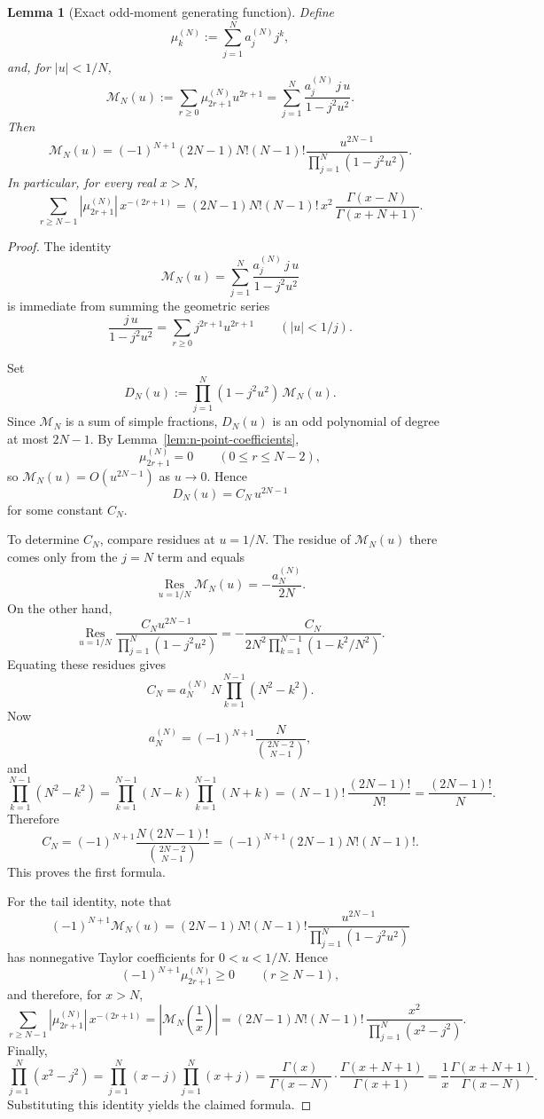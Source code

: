 \documentclass[11pt,a4paper]{amsart}
\theoremstyle{plain}
\newtheorem{lemma}[theorem]{Lemma}
\theoremstyle{definition}
\begin{document}
\begin{lemma}[Exact odd-moment generating function]
\label{lem:n-point-odd-generating-function}
Define
\[
\mu_k^{(N)}:=\sum_{j=1}^N a_j^{(N)}j^k,
\]
and, for $|u|<1/N$,
\[
\mathcal M_N(u)
:=
\sum_{r\ge 0}\mu_{2r+1}^{(N)}u^{2r+1}
=
\sum_{j=1}^N \frac{a_j^{(N)}\,j\,u}{1-j^2u^2}.
\]
Then
\[
\mathcal M_N(u)
=
(-1)^{N+1}(2N-1)N!(N-1)!
\frac{u^{2N-1}}{\prod_{j=1}^N(1-j^2u^2)}.
\]
In particular, for every real $x>N$,
\[
\sum_{r\ge N-1} |\mu_{2r+1}^{(N)}|\,x^{-(2r+1)}
=
(2N-1)N!(N-1)!\,x^2\,
\frac{\Gamma(x-N)}{\Gamma(x+N+1)}.
\]
\end{lemma}

\begin{proof}
The identity
\[
\mathcal M_N(u)
=
\sum_{j=1}^N \frac{a_j^{(N)}\,j\,u}{1-j^2u^2}
\]
is immediate from summing the geometric series
\[
\frac{j\,u}{1-j^2u^2}
=
\sum_{r\ge 0} j^{2r+1}u^{2r+1}
\qquad (|u|<1/j).
\]

Set
\[
D_N(u):=
\prod_{j=1}^N(1-j^2u^2)\,\mathcal M_N(u).
\]
Since $\mathcal M_N$ is a sum of simple fractions, $D_N(u)$ is an odd
polynomial of degree at most $2N-1$. By
Lemma~\ref{lem:n-point-coefficients},
\[
\mu_{2r+1}^{(N)}=0
\qquad (0\le r\le N-2),
\]
so $\mathcal M_N(u)=O(u^{2N-1})$ as $u\to 0$. Hence
\[
D_N(u)=C_N\,u^{2N-1}
\]
for some constant $C_N$.

To determine $C_N$, compare residues at $u=1/N$. The residue of
$\mathcal M_N(u)$ there comes only from the $j=N$ term and equals
\[
\operatorname*{Res}_{u=1/N}\mathcal M_N(u)
=
-\frac{a_N^{(N)}}{2N}.
\]
On the other hand,
\[
\operatorname*{Res}_{u=1/N}
\frac{C_Nu^{2N-1}}{\prod_{j=1}^N(1-j^2u^2)}
=
-\frac{C_N}{2N^2\prod_{k=1}^{N-1}(1-k^2/N^2)}.
\]
Equating these residues gives
\[
C_N
=
a_N^{(N)}\,N\prod_{k=1}^{N-1}(N^2-k^2).
\]
Now
\[
a_N^{(N)}
=
(-1)^{N+1}\frac{N}{\binom{2N-2}{N-1}},
\]
and
\[
\prod_{k=1}^{N-1}(N^2-k^2)
=
\prod_{k=1}^{N-1}(N-k)\prod_{k=1}^{N-1}(N+k)
=
(N-1)!\,\frac{(2N-1)!}{N!}
=
\frac{(2N-1)!}{N}.
\]
Therefore
\[
C_N
=
(-1)^{N+1}\frac{N(2N-1)!}{\binom{2N-2}{N-1}}
=
(-1)^{N+1}(2N-1)N!(N-1)!.
\]
This proves the first formula.

For the tail identity, note that
\[
(-1)^{N+1}\mathcal M_N(u)
=
(2N-1)N!(N-1)!
\frac{u^{2N-1}}{\prod_{j=1}^N(1-j^2u^2)}
\]
has nonnegative Taylor coefficients for $0<u<1/N$. Hence
\[
(-1)^{N+1}\mu_{2r+1}^{(N)}\ge 0
\qquad (r\ge N-1),
\]
and therefore, for $x>N$,
\[
\sum_{r\ge N-1} |\mu_{2r+1}^{(N)}|\,x^{-(2r+1)}
=
\left|\mathcal M_N\!\left(\frac1x\right)\right|
=
(2N-1)N!(N-1)!\,
\frac{x^2}{\prod_{j=1}^N(x^2-j^2)}.
\]
Finally,
\[
\prod_{j=1}^N(x^2-j^2)
=
\prod_{j=1}^N(x-j)\prod_{j=1}^N(x+j)
=
\frac{\Gamma(x)}{\Gamma(x-N)}\cdot
\frac{\Gamma(x+N+1)}{\Gamma(x+1)}
=
\frac{1}{x}\frac{\Gamma(x+N+1)}{\Gamma(x-N)}.
\]
Substituting this identity yields the claimed formula.
\end{proof}
\end{document}
